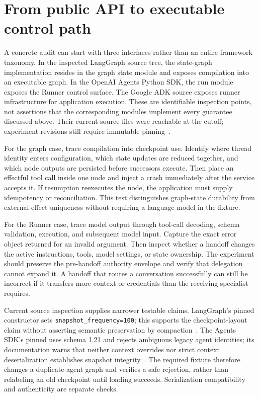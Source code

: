 \section{From public API to executable control path}\label{sec:C22:codepaths}
A concrete audit can start with three interfaces rather than an entire framework taxonomy. In the inspected LangGraph source tree, the state-graph implementation resides in the graph state module and exposes compilation into an executable graph. In the OpenAI Agents Python SDK, the run module exposes the Runner control surface. The Google ADK source exposes runner infrastructure for application execution. These are identifiable inspection points, not assertions that the corresponding modules implement every guarantee discussed above. Their current source files were reachable at the cutoff; experiment revisions still require immutable pinning~\cite{executionproduct001,executionproduct002,executionproduct003}.

For the graph case, trace compilation into checkpoint use. Identify where thread identity enters configuration, which state updates are reduced together, and which node outputs are persisted before successors execute. Then place an effectful tool call inside one node and inject a crash immediately after the service accepts it. If resumption reexecutes the node, the application must supply idempotency or reconciliation. This test distinguishes graph-state durability from external-effect uniqueness without requiring a language model in the fixture.

For the Runner case, trace model output through tool-call decoding, schema validation, execution, and subsequent model input. Capture the exact error object returned for an invalid argument. Then inspect whether a handoff changes the active instructions, tools, model settings, or state ownership. The experiment should preserve the pre-handoff authority envelope and verify that delegation cannot expand it. A handoff that routes a conversation successfully can still be incorrect if it transfers more context or credentials than the receiving specialist requires.

Current source inspection supplies narrower testable claims. LangGraph's pinned  constructor sets \texttt{snapshot\_frequency=100}; this supports the checkpoint-layout claim without asserting semantic preservation by compaction~\cite{cumb2026langgraphcode}. The Agents SDK's pinned  uses schema 1.21 and rejects ambiguous legacy agent identities; its documentation warns that neither context overrides nor strict context deserialization establishes snapshot integrity~\cite{cumb2026agentsstate}. The required fixture therefore changes a duplicate-agent graph and verifies a safe rejection, rather than relabeling an old checkpoint until loading succeeds. Serialization compatibility and authenticity are separate checks.

